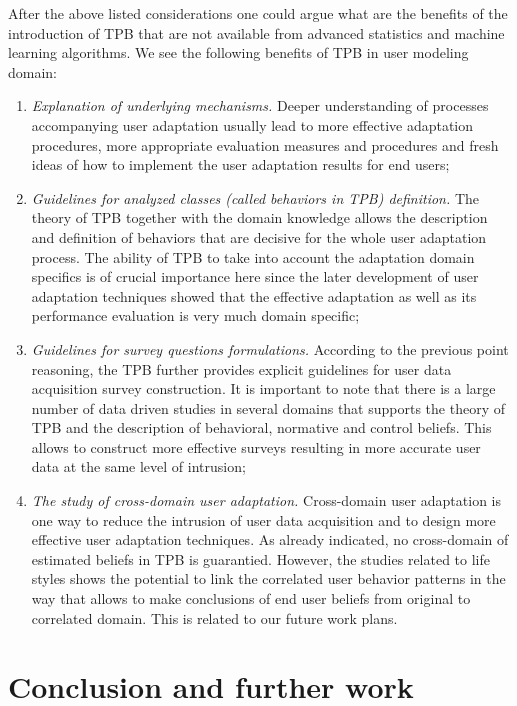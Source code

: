 \documentclass{llncs}
\begin{document}
\vspace{0.6em}
 After the above listed considerations one could argue what are the benefits of the introduction of TPB that are not available from advanced statistics and machine learning algorithms. We see the following benefits of TPB in user modeling domain:
\begin{enumerate}
 \item {\it Explanation of underlying mechanisms.} Deeper understanding of processes accompanying user adaptation usually lead to more effective adaptation procedures, more appropriate evaluation measures and procedures and fresh ideas of how to implement the user adaptation results for end users;
 \item {\it Guidelines for analyzed classes (called behaviors in TPB) definition.} The theory of TPB together with the domain knowledge allows the description and definition of behaviors that are decisive for the whole user adaptation process. The ability of TPB to take into account the adaptation domain specifics is of crucial importance here since the later development of user adaptation techniques showed that the effective adaptation as well as its performance evaluation is very much domain specific;
 \item {\it Guidelines for survey questions formulations.} According to the previous point reasoning, the TPB further provides explicit guidelines for user data acquisition survey construction. It is important to note that there is a large number of data driven studies in several domains that supports the theory of TPB and the description of behavioral, normative and control beliefs. This allows to construct more effective surveys resulting in more accurate user data at the same level of intrusion; 
 \item {\it The study of cross-domain user adaptation.} Cross-domain user adaptation is one way to reduce the intrusion of user data acquisition and to design more effective user adaptation techniques. As already indicated, no cross-domain of estimated beliefs in TPB is guarantied. However, the studies related to life styles \cite{Dewberry2013} shows the potential to link the correlated user behavior patterns in the way that allows to make conclusions of end user beliefs from original to correlated domain. This is related to our future work plans. 
\end{enumerate}

\section{Conclusion and further work}\label{Sec_ConcAndFW}
\end{document}
